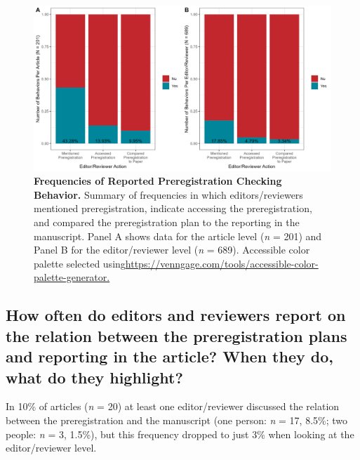 \documentclass[authordate, empirical]{jote-new-article}
\begin{document}
	\begin{figure}
		\includegraphics[width=\textwidth]{media/image2.png}

		\caption{\textbf{Frequencies of Reported Preregistration Checking Behavior.}\emph{ }Summary of frequencies in which editors/reviewers mentioned preregistration, indicate accessing the preregistration, and compared the preregistration plan to the reporting in the manuscript. Panel A shows data for the article level (\emph{n} = 201) and Panel B for the editor/reviewer level (\emph{n} = 689). Accessible color palette selected using\url{https://venngage.com/tools/accessible-color-palette-generator.}}

		\label{fig:rId11}


	\end{figure}

	\subsection{How often do editors and reviewers report on the relation between the preregistration plans and reporting in the article? When they do, what do they highlight?}



	In 10\% of articles (\emph{n} = 20) at least one editor/reviewer discussed the relation between the preregistration and the manuscript (one person: \emph{n} = 17, 8.5\%; two people: \emph{n} = 3, 1.5\%), but this frequency dropped to just 3\% when looking at the editor/reviewer level.
\end{document}

